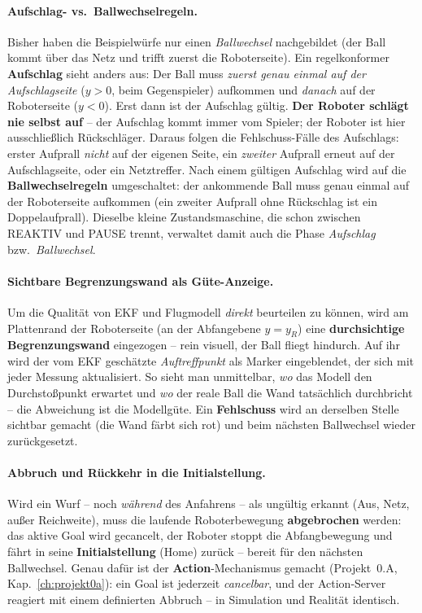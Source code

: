 \paragraph{Aufschlag- vs.\ Ballwechselregeln.} Bisher haben die Beispielwürfe nur
einen \emph{Ballwechsel} nachgebildet (der Ball kommt über das Netz und trifft
zuerst die Roboterseite). Ein regelkonformer \textbf{Aufschlag} sieht anders aus:
Der Ball muss \emph{zuerst genau einmal auf der Aufschlagseite} ($y>0$, beim
Gegenspieler) aufkommen und \emph{danach} auf der Roboterseite ($y<0$). Erst dann
ist der Aufschlag gültig. \textbf{Der Roboter schlägt nie selbst auf} -- der
Aufschlag kommt immer vom Spieler; der Roboter ist hier ausschließlich
Rückschläger. Daraus folgen die Fehlschuss-Fälle des Aufschlags: erster Aufprall
\emph{nicht} auf der eigenen Seite, ein \emph{zweiter} Aufprall erneut auf der
Aufschlagseite, oder ein Netztreffer. Nach einem gültigen Aufschlag wird auf die
\textbf{Ballwechselregeln} umgeschaltet: der ankommende Ball muss genau einmal auf
der Roboterseite aufkommen (ein zweiter Aufprall ohne Rückschlag ist ein
Doppelaufprall). Dieselbe kleine Zustandsmaschine, die schon zwischen REAKTIV und
PAUSE trennt, verwaltet damit auch die Phase \emph{Aufschlag} bzw.\
\emph{Ballwechsel}.

\paragraph{Sichtbare Begrenzungswand als Güte-Anzeige.} Um die Qualität von EKF
und Flugmodell \emph{direkt} beurteilen zu können, wird am Plattenrand der
Roboterseite (an der Abfangebene $y=y_R$) eine \textbf{durchsichtige
Begrenzungswand} eingezogen -- rein visuell, der Ball fliegt hindurch. Auf ihr
wird der vom EKF geschätzte \emph{Auftreffpunkt} als Marker eingeblendet, der sich
mit jeder Messung aktualisiert. So sieht man unmittelbar, \emph{wo} das Modell den
Durchstoßpunkt erwartet und \emph{wo} der reale Ball die Wand tatsächlich
durchbricht -- die Abweichung ist die Modellgüte. Ein \textbf{Fehlschuss} wird an
derselben Stelle sichtbar gemacht (die Wand färbt sich rot) und beim nächsten
Ballwechsel wieder zurückgesetzt.

\paragraph{Abbruch und Rückkehr in die Initialstellung.} Wird ein Wurf -- noch
\emph{während} des Anfahrens -- als ungültig erkannt (Aus, Netz, außer
Reichweite), muss die laufende Roboterbewegung \textbf{abgebrochen} werden: das
aktive Goal wird gecancelt, der Roboter stoppt die Abfangbewegung und fährt in
seine \textbf{Initialstellung} (Home) zurück -- bereit für den nächsten
Ballwechsel. Genau dafür ist der \textbf{Action}-Mechanismus gemacht
(Projekt~0.A, Kap.~\ref{ch:projekt0a}): ein Goal ist jederzeit \emph{cancelbar},
und der Action-Server reagiert mit einem definierten Abbruch -- in Simulation und
Realität identisch.

